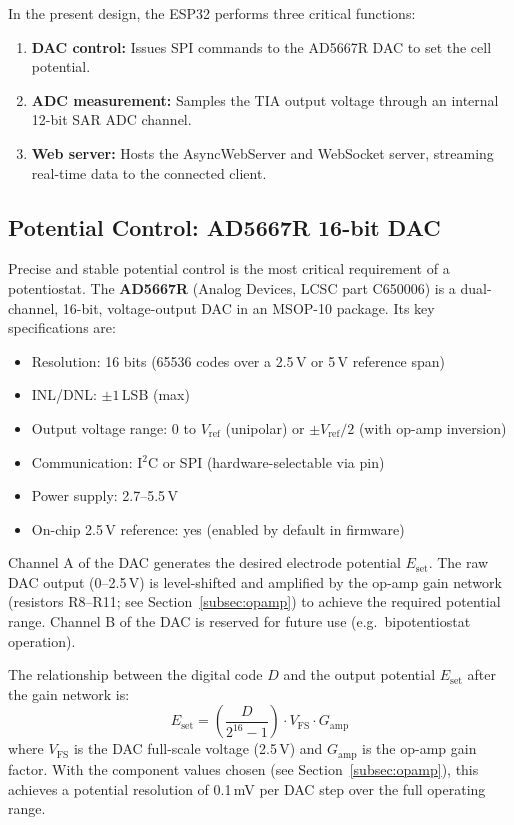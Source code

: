 In the present design, the ESP32 performs three critical functions:
\begin{enumerate}
    \item \textbf{DAC control:} Issues SPI commands to the AD5667R DAC to set the cell potential.
    \item \textbf{ADC measurement:} Samples the TIA output voltage through an internal 12-bit SAR ADC channel.
    \item \textbf{Web server:} Hosts the AsyncWebServer and WebSocket server, streaming real-time data to the connected client.
\end{enumerate}

\subsection{Potential Control: AD5667R 16-bit DAC}
\label{subsec:dac}

Precise and stable potential control is the most critical requirement of a potentiostat. The \textbf{AD5667R} (Analog Devices, LCSC part C650006) is a dual-channel, 16-bit, voltage-output DAC in an MSOP-10 package. Its key specifications are:
\begin{itemize}
    \item Resolution: 16 bits (65536 codes over a 2.5\,V or 5\,V reference span)
    \item INL/DNL: $\pm 1$\,LSB (max)
    \item Output voltage range: 0 to $V_\mathrm{ref}$ (unipolar) or $\pm V_\mathrm{ref}/2$ (with op-amp inversion)
    \item Communication: I$^2$C or SPI (hardware-selectable via pin)
    \item Power supply: 2.7--5.5\,V
    \item On-chip 2.5\,V reference: yes (enabled by default in firmware)
\end{itemize}
Channel A of the DAC generates the desired electrode potential $E_\mathrm{set}$. The raw DAC output (0--2.5\,V) is level-shifted and amplified by the op-amp gain network (resistors R8--R11; see Section~\ref{subsec:opamp}) to achieve the required potential range. Channel B of the DAC is reserved for future use (e.g.\ bipotentiostat operation).

The relationship between the digital code $D$ and the output potential $E_\mathrm{set}$ after the gain network is:
\begin{equation}
    E_\mathrm{set} = \left(\frac{D}{2^{16} - 1}\right) \cdot V_\mathrm{FS} \cdot G_\mathrm{amp}
    \label{eq:dac_transfer}
\end{equation}
where $V_\mathrm{FS}$ is the DAC full-scale voltage (2.5\,V) and $G_\mathrm{amp}$ is the op-amp gain factor. With the component values chosen (see Section~\ref{subsec:opamp}), this achieves a potential resolution of \texttildelow{}0.1\,mV per DAC step over the full operating range.

